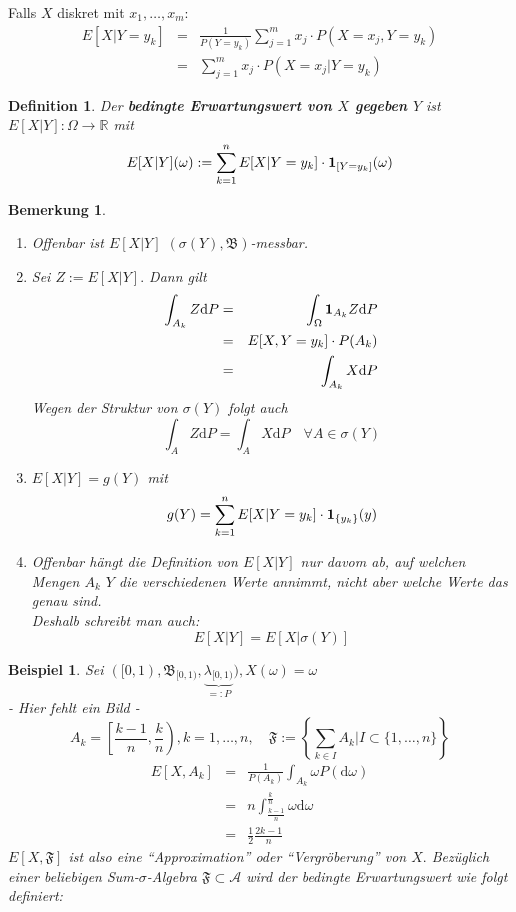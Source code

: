 \documentclass[a4paper,11pt]{book}
\newcommand{\R}{{\mathbb R}}
\newcommand{\ind}{\text{\bf{1}}}
\def\AA{ \mathcal{A} }
\def\FF{ \mathfrak{F} }
\def\BB{ \mathfrak{B} }
\def\d{\mbox{d}}
\newtheorem*{DefON}{Definition}
\newtheorem{Bsp}{Beispiel}[chapter]
\newtheorem*{BemON}{Bemerkung}
\theoremstyle{nonumberplain}
\begin{document}
Falls $X$ diskret mit $x_1, \ldots, x_m$:
\begin{eqnarray*}
E[X|Y=y_k] &=& \frac 1 {P(Y=y_k)} \sum_{j=1}^m x_j\cdot P(X=x_j, Y=y_k)\\
&=& \sum_{j=1}^m x_j\cdot P(X=x_j|Y=y_k)
\end{eqnarray*}

\begin{DefON} Der \textbf{bedingte Erwartungswert von $X$ gegeben $Y$}  ist $E[X|Y]:\Omega\to\R$ mit 
$$E[X|Y](\omega):=\sum_{k=1}^n E[X|Y=y_k]\cdot \ind_{[Y=y_k]}(\omega)$$
\end{DefON}

\begin{BemON}\begin{enumerate}
\item[a)] Offenbar ist $E[X|Y]$ $(\sigma(Y),\BB)$-messbar.
\item[b)] Sei $Z:=E[X|Y].$ Dann gilt
\begin{eqnarray*}
\int_{A_k} Z\d P &=& \int_\Omega \ind_{A_k} Z\d P\\
&=&E[X,Y=y_k]\cdot P(A_k)\\
&=& \int_{A_k}X\d P
\end{eqnarray*}
Wegen der Struktur von $\sigma(Y)$ folgt auch
$$\int_A Z\d P = \int_{A}X\d P\quad\forall A\in\sigma(Y)$$
\item[c)] $E[X|Y] = g(Y)$ mit
$$g(Y)=\sum_{k=1}^n E[X|Y=y_k]\cdot\ind_{\{y_k\}}(y)$$
\item[d)] Offenbar hängt die Definition von $E[X|Y]$ nur davom ab, auf welchen Mengen $A_k$ $Y$ die verschiedenen Werte annimmt, nicht aber welche Werte das genau sind.\\
Deshalb schreibt man auch:
$$E[X|Y]=E[X|\sigma(Y)]$$
\end{enumerate}
\end{BemON}

\begin{Bsp}\label{Bsp7.1} Sei $([0,1), \BB_{[0,1)}, \underbrace{\lambda_{[0,1)}}_{=:P}), X(\omega) = \omega$\\
- Hier fehlt ein Bild -\\
$$A_k=\left[\frac {k-1} n\right., \left.\frac k n\right), k = 1, \ldots, n,\quad \FF:=\left\{\sum_{k\in I} A_k| I\subset\{1,\ldots, n\}\right\}$$
\begin{eqnarray*}
E[X, A_k] &=& \frac 1 {P(A_k)} \int_{A_k}\omega P(\d\omega)\\
&=& n\int_{\frac {k-1} n}^{\frac k n} \omega\d\omega\\
&=& \frac 1 2 \frac {2k-1} n
\end{eqnarray*}
$E[X, \FF]$ ist also eine "`Approximation"' oder "`Vergröberung"' von $X.$ Bezüglich einer beliebigen Sum-$\sigma$-Algebra $\FF\subset\AA$ wird der bedingte Erwartungswert wie folgt definiert:
\end{Bsp}
\end{document}

